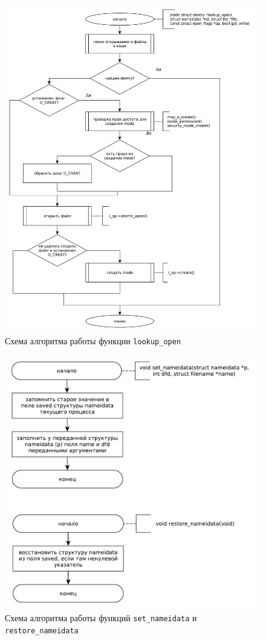 \begin{figure}[h!btp]
	\centering
	\includegraphics[width=490pt]{inc/lookup_open.pdf}
	\caption{Схема алгоритма работы функции \texttt{lookup\_open}}
\end{figure}

\clearpage

\begin{figure}[h!btp]
	\centering
	\includegraphics[width=490pt]{inc/nameidata.pdf}
	\caption{Схема алгоритма работы функций \texttt{set\_nameidata} и \texttt{restore\_nameidata}}
\end{figure}